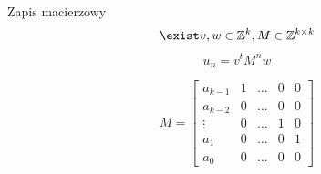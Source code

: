 \documentclass[handout]{beamer}
\theoremstyle{definition}
\theoremstyle{named}
\begin{document}
\begin{frame}{Zapis macierzowy}
    $$\exist v, w \in \mathbb{Z}^{k}, M \in \mathbb{Z}^{k\times k} $$
    $$u_n = v^{t}M^{n}w$$

    \begin{equation*}
    
        M = \begin{bmatrix}
        a_{k-1} & 1 & \ldots & 0 & 0 \\
        a_{k-2} & 0 & \ldots & 0 & 0 \\
        \vdots & 0 & \ldots & 1 & 0 \\ 
        a_1 & 0 & \ldots & 0 & 1 \\
        a_0 & 0 & \ldots & 0 & 0
        \end{bmatrix}
    \end{equation*}
\end{frame}
\end{document}
